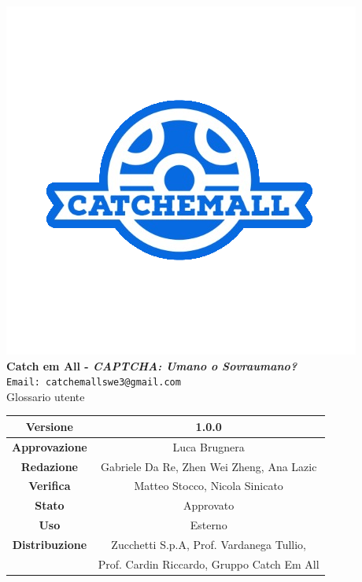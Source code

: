 \begin{titlepage}
\begin{center}
	\includegraphics[scale = 1.5]{img/logo.png}\\
	\bigskip
	\large \textbf{Catch em All - \textit{CAPTCHA: Umano o Sovraumano?}}\\
	\texttt{Email: catchemallswe3@gmail.com}\\
	\vfill
	{\fontsize{1.5cm}{0}\selectfont Glossario utente}\\
	\vfill
	\setlength\extrarowheight{5pt}
	\begin{tabularx}{\textwidth}{| c | c |}
		\hline
		\textbf{Versione} & 1.0.0\\
		\hline
		\textbf{Approvazione} & Luca Brugnera \\
		\hline
		\textbf{Redazione} & Gabriele Da Re, Zhen Wei Zheng, Ana Lazic\\
		\hline
		\textbf{Verifica} & Matteo Stocco, Nicola Sinicato\\
		\hline
		\textbf{Stato} & Approvato\\
		\hline
		\textbf{Uso} & Esterno\\
		\hline
		\textbf{Distribuzione} & Zucchetti S.p.A, Prof. Vardanega Tullio, \\
		&  Prof. Cardin Riccardo, Gruppo Catch Em All\\
		\hline
	\end{tabularx}
\end{center}
\end{titlepage} 
